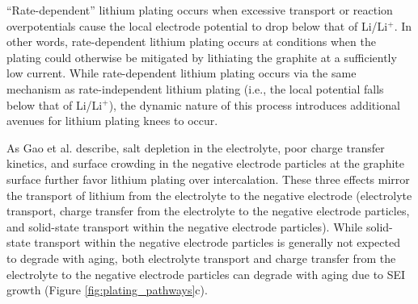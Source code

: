 \documentclass[journal=jpclcd,manuscript=article]{achemso}
\begin{document}
``Rate-dependent'' lithium plating occurs when excessive transport or reaction overpotentials cause the local electrode potential to drop below that of Li/Li$\mathrm{^+}$.
In other words, rate-dependent lithium plating occurs at conditions when the plating could otherwise be mitigated by lithiating the graphite at a sufficiently low current.
While rate-dependent lithium plating occurs via the same mechanism as rate-independent lithium plating (i.e., the local potential falls below that of Li/Li$^+$), the dynamic nature of this process introduces additional avenues for lithium plating knees to occur.

As Gao et al.\cite{gao_interplay_2021} describe, salt depletion in the electrolyte, poor charge transfer kinetics, and surface crowding in the negative electrode particles at the graphite surface further favor lithium plating over intercalation.
These three effects mirror the transport of lithium from the electrolyte to the negative electrode (electrolyte transport, charge transfer from the electrolyte to the negative electrode particles, and solid-state transport within the negative electrode particles).
While solid-state transport within the negative electrode particles is generally not expected to degrade with aging,
both electrolyte transport and charge transfer from the electrolyte to the negative electrode particles can degrade with aging due to SEI growth (Figure \ref{fig:plating_pathways}c).
\end{document}
